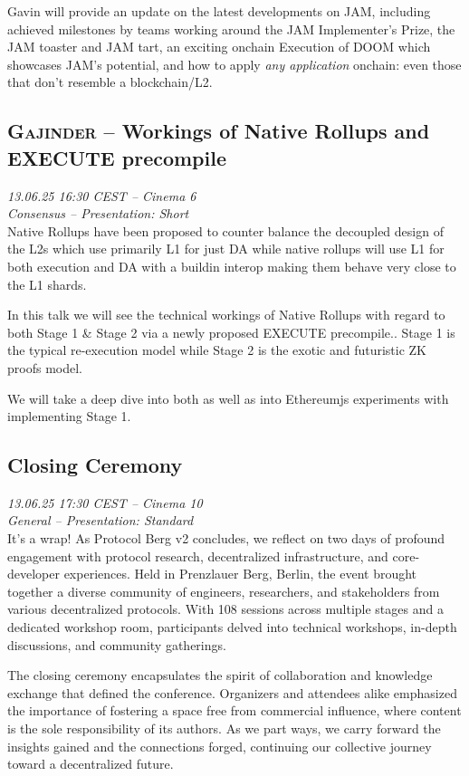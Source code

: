 Gavin will provide an update on the latest developments on JAM, including achieved milestones by teams working around the JAM Implementer’s Prize, the JAM toaster and JAM tart, an exciting onchain Execution of DOOM which showcases JAM’s potential, and how to apply \emph{any application} onchain: even those that don't resemble a blockchain/L2.

\clearpage
\subsection {\textsc{Gajinder}  -- Workings of Native Rollups and EXECUTE precompile} \noindent \textit {13.06.25 16:30 CEST -- Cinema 6\\ Consensus -- Presentation: Short}\\[1em] Native Rollups have been proposed to counter balance the decoupled design of the L2s which use primarily L1 for just DA while native rollups will use L1 for both execution and DA with a buildin  interop  making them behave very close to the L1 shards.

In this talk we will see the technical workings of Native Rollups with regard to both Stage 1 \& Stage 2 via a newly proposed EXECUTE precompile..  Stage 1 is the typical re-execution model while Stage 2 is the exotic and futuristic ZK proofs model.

We will take a deep dive into both as well as into Ethereumjs experiments with implementing Stage 1.

\clearpage
\subsection {Closing Ceremony} \noindent \textit {13.06.25 17:30 CEST -- Cinema 10\\ General -- Presentation: Standard}\\[1em] It's a wrap! As Protocol Berg v2 concludes, we reflect on two days of profound engagement with protocol research, decentralized infrastructure, and core-developer experiences. Held in Prenzlauer Berg, Berlin, the event brought together a diverse community of engineers, researchers, and stakeholders from various decentralized protocols. With 108 sessions across multiple stages and a dedicated workshop room, participants delved into technical workshops, in-depth discussions, and community gatherings.

The closing ceremony encapsulates the spirit of collaboration and knowledge exchange that defined the conference. Organizers and attendees alike emphasized the importance of fostering a space free from commercial influence, where content is the sole responsibility of its authors. As we part ways, we carry forward the insights gained and the connections forged, continuing our collective journey toward a decentralized future.

\clearpage
\cleardoublepage
\cleardoublepage
\cleardoublepage

